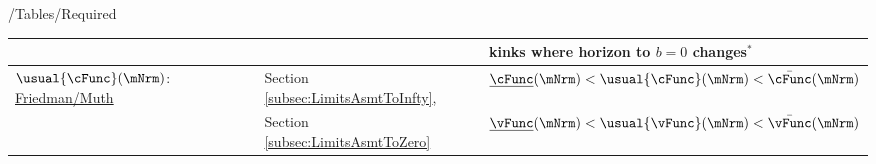 \documentclass[\econtexRoot/BufferStockTheory]{subfiles}
\providecommand{\TblName}{}
\renewcommand{\TblName}{Required}
\begin{document}
\begin{verbatimwrite}{\econtexRoot/Tables/\TblName}
\begin{table}
{\begin{tabular}{|l|l|l|}
        \\                                                                                                                        &                                         & kinks where horizon to $b=0$ changes$^{\ast}$
        \\ \hline\hline \multicolumn{1}{|l|}{$\usual{\cFunc}(\mNrm)$:  \hyperlink{Uncertainty-Modified-Conditions}{Friedman/Muth}
        }                                                                                                                       & Section \ref{subsec:LimitsAsmtToInfty}, & $\underline{\cFunc}(\mNrm) < \usual{\cFunc}(\mNrm) < \bar{\cFunc}(\mNrm)$ %
        \\                                                                                                                      & Section \ref{subsec:LimitsAsmtToZero}   & $\underline{\vFunc}(\mNrm) < \usual{\vFunc}(\mNrm) < \bar{\vFunc}(\mNrm)$ %
                                                                                                                                                                       

\end{tabular}}
\end{table}
\end{verbatimwrite}
\end{document}
